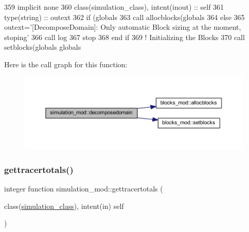 \begin{DoxyCode}
359     \textcolor{keywordtype}{implicit none}
360     \textcolor{keywordtype}{class}(simulation\_class), \textcolor{keywordtype}{intent(inout)} :: self
361     \textcolor{keywordtype}{type}(string) :: outext
362     \textcolor{keywordflow}{if} (globals%
363         \textcolor{keyword}{call }allocblocks(globals%
364     \textcolor{keywordflow}{else}
365         outext=\textcolor{stringliteral}{'[DecomposeDomain]: Only automatic Block sizing at the moment, stoping'}
366         \textcolor{keyword}{call }log%
367         stop
368 \textcolor{keywordflow}{    end if}
369     \textcolor{comment}{! Initializing the Blocks}
370     \textcolor{keyword}{call }setblocks(globals%
      globals%
\end{DoxyCode}
Here is the call graph for this function\+:
\nopagebreak
\begin{figure}[H]
\begin{center}
\leavevmode
\includegraphics[width=350pt]{namespacesimulation__mod_a2b8198a9fb3f7671c6b45192a0b9740c_cgraph}
\end{center}
\end{figure}
\mbox{\label{namespacesimulation__mod_a0ad485eab624ffa4df282f1da8d9f214}} 
\subsubsection{\texorpdfstring{gettracertotals()}{gettracertotals()}}
{\footnotesize\ttfamily integer function simulation\+\_\+mod\+::gettracertotals (\begin{DoxyParamCaption}\item[{class(\mbox{\hyperlink{structsimulation__mod_1_1simulation__class}{simulation\+\_\+class}}), intent(in)}]{self }\end{DoxyParamCaption})\hspace{0.3cm}{\ttfamily [private]}}



